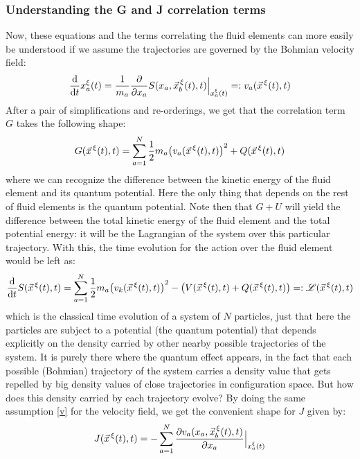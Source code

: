 \documentclass[11pt, a4paper]{article} %
\newcommand{\Lg}{\mathscr{L}}
\begin{document}
\subsubsection*{Understanding the G and J correlation terms}
Now, these equations and the terms correlating the fluid elements can more easily be understood if we assume the trajectories are governed by the Bohmian velocity field:
\begin{equation}\label{v}
\dv{}{t}x_a^\xi(t)=\frac{1}{m_a}\pdv{}{x_a}S(x_a, \vec{x}_b^{\, \xi}(t),t)\Big\rvert_{x^\xi_a(t)}=:v_a(\vec{x}^{\, \xi}(t),t)
\end{equation}
After a pair of simplifications and re-orderings, we get that the correlation term $G$ takes the following shape:
\begin{equation}
G(\vec{x}^{\, \xi}(t),t)=\sum_{a=1}^N \frac{1}{2}m_a\qty(v_a(\vec{x}^{\, \xi}(t),t))^2+Q(\vec{x}^{\, \xi}(t),t)
\end{equation}
where we can recognize the difference between the kinetic energy of the fluid element and its quantum potential. Here the only thing that depends on the rest of fluid elements is the quantum potential. Note then that $G+U$ will yield the difference between the total kinetic energy of the fluid element and the total potential energy: it will be the Lagrangian of the system over this particular trajectory. With this, the time evolution for the action over the fluid element would be left as:
\begin{equation}\label{HJE.L.Bohm}
\dv{}{t}S(\vec{x}^{\, \xi}(t),t)=  \sum_{a=1}^N \frac{1}{2} m_a \qty(v_k(\vec{x}^{\, \xi}(t),t) )^2 - \qty(V(\vec{x}^{\, \xi}(t),t)+ Q(\vec{x}^{\, \xi}(t),t))=: \Lg(\vec{x}^{\, \xi}(t),t)
\end{equation}
which is the classical time evolution of a system of $N$ particles, just that  here the particles are subject to a potential (the quantum potential) that depends explicitly on the density carried by other nearby possible trajectories of the system. It is purely there where the quantum effect appears, in the fact that each possible (Bohmian) trajectory of the system carries a density value that gets repelled by big density values of close trajectories in configuration space. But how does this density carried by each trajectory evolve? By doing the same assumption \eqref{v} for the velocity field, we get the convenient shape for $J$ given by:
\begin{equation}
J(\vec{x}^{\, \xi}(t),t)=-\sum_{a=1}^N \pdv{v_a(x_a, \vec{x}_b^{\, \xi}(t),t)}{x_a}\Big\rvert_{x_a^\xi(t)}
\end{equation}
\end{document}

